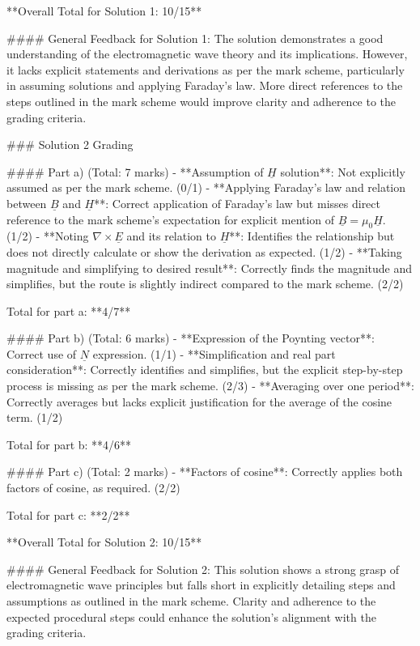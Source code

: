 \documentclass[a4paper,11pt]{article}
\begin{document}
**Overall Total for Solution 1: 10/15**

#### General Feedback for Solution 1:
The solution demonstrates a good understanding of the electromagnetic wave theory and its implications. However, it lacks explicit statements and derivations as per the mark scheme, particularly in assuming solutions and applying Faraday's law. More direct references to the steps outlined in the mark scheme would improve clarity and adherence to the grading criteria.

### Solution 2 Grading

#### Part a) (Total: 7 marks)
- **Assumption of \(\underline{H}\) solution**: Not explicitly assumed as per the mark scheme. (0/1)
- **Applying Faraday's law and relation between \(\underline{B}\) and \(\underline{H}\)**: Correct application of Faraday's law but misses direct reference to the mark scheme's expectation for explicit mention of \(\underline{B} = \mu_0 \underline{H}\). (1/2)
- **Noting \(\nabla \times \underline{E}\) and its relation to \(\underline{H}\)**: Identifies the relationship but does not directly calculate or show the derivation as expected. (1/2)
- **Taking magnitude and simplifying to desired result**: Correctly finds the magnitude and simplifies, but the route is slightly indirect compared to the mark scheme. (2/2)

Total for part a: **4/7**

#### Part b) (Total: 6 marks)
- **Expression of the Poynting vector**: Correct use of \(\underline{N}\) expression. (1/1)
- **Simplification and real part consideration**: Correctly identifies and simplifies, but the explicit step-by-step process is missing as per the mark scheme. (2/3)
- **Averaging over one period**: Correctly averages but lacks explicit justification for the average of the cosine term. (1/2)

Total for part b: **4/6**

#### Part c) (Total: 2 marks)
- **Factors of cosine**: Correctly applies both factors of cosine, as required. (2/2)

Total for part c: **2/2**

**Overall Total for Solution 2: 10/15**

#### General Feedback for Solution 2:
This solution shows a strong grasp of electromagnetic wave principles but falls short in explicitly detailing steps and assumptions as outlined in the mark scheme. Clarity and adherence to the expected procedural steps could enhance the solution's alignment with the grading criteria.
\end{document}
